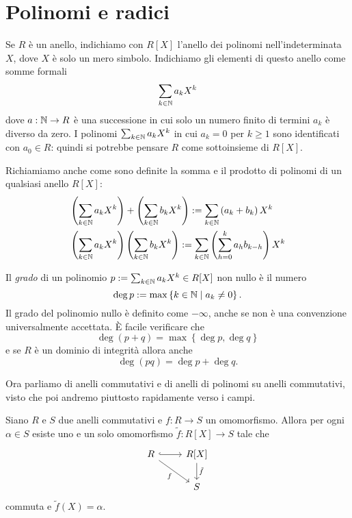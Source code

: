 

\section{Polinomi e radici}

Se $R$ è un anello, indichiamo con $R[X]$ l'anello dei polinomi nell'indeterminata $X$, dove $X$ è solo un mero simbolo. Indichiamo gli elementi di questo anello come somme formali
\[\sum_{k \in \mathbb{N}} a_k X^k\]
dove $a : \mathbb{N} \to R$ è una successione in cui solo un numero finito di termini $a_k$ è diverso da zero. I polinomi $\sum_{k \in \mathbb{N}} a_k X^k$ in cui $a_k = 0$ per $k \ge 1$ sono identificati con $a_0 \in R$: quindi si potrebbe pensare $R$ come sottoinsieme di $R[X]$.

Richiamiamo anche come sono definite la somma e il prodotto di polinomi di un qualsiasi anello $R[X]$:%
\begin{align*}
& \left(\sum_{k \in \mathbb{N}} a_k X^k\right) + \left(\sum_{k \in \mathbb{N}} b_k X^k\right) := \sum_{k \in \mathbb{N}} \left(a_k+b_k\right) X^k \\
& \left(\sum_{k \in \mathbb{N}} a_k X^k\right) \left(\sum_{k \in \mathbb{N}} b_k X^k\right) := \sum_{k \in \mathbb{N}} \left(\sum_{h=0}^k a_h b_{k-h}\right) X^k
\end{align*}

Il {\em grado} di un polinomio $p := \sum_{k \in \mathbb{N}} a_k X^k \in R[X]$ non nullo è il numero
\[\deg p := \max \left\{k \in \mathbb{N} \mid a_k \ne 0 \right\} .\]
Il grado del polinomio nullo è definito come $-\infty$, anche se non è una convenzione universalmente accettata. È facile verificare che
\[\deg(p + q) = \max\left\{ \deg p, \deg q \right\}\]
e se $R$ è un dominio di integrità allora anche
\[\deg(pq) = \deg p + \deg q .\]

Ora parliamo di anelli commutativi e di anelli di polinomi su anelli commutativi, visto che poi andremo piuttosto rapidamente verso i campi.

\begin{prop}\label{prop:OmomorfismiDaAnelliPolinomi}
Siano $R$ e $S$ due anelli commutativi e $f : R \to S$ un omomorfismo. Allora per ogni $\alpha \in S$ esiste uno e un solo omomorfismo $\tilde f : R[X] \to S$ tale che
\[\begin{tikzcd}
R \ar["f", dr, swap] \ar[hookrightarrow, r] & R[X] \ar["{\tilde f}", d] \\
                                            & S
\end{tikzcd}\]
commuta e $\tilde f (X) = \alpha$.
\end{prop}


